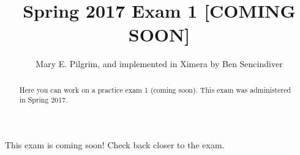 \documentclass[handout]{ximera}
\author{Mary E. Pilgrim, and implemented in Ximera by Ben Sencindiver}
\title{Spring 2017 Exam 1 [COMING SOON]}
\begin{document}
\begin{abstract}
  Here you can work on a practice exam 1 (coming soon). This exam was administered in Spring 2017.
\end{abstract}
\maketitle

This exam is coming soon!  Check back closer to the exam. 
\end{document}
